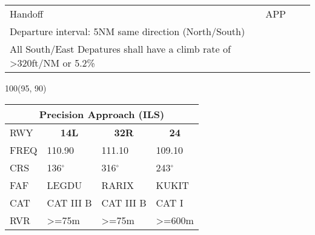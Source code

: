 \documentclass[10pt,landscape,a4paper]{article}
\begin{document}
\begin{textblock}{40}
\begin{table}[]
\begin{tabular}{lccccccc}
\multicolumn{2}{|l}{Handoff} & 
\multicolumn{4}{c}{\textunderscore{}APP} & 
\multicolumn{1}{c|}{} & 
\multicolumn{1}{l}{} \\ \cline{1-7}
\multicolumn{5}{l}{Departure interval: 5NM same direction (North/South)} \\
\multicolumn{5}{l}{All South/East Depatures shall have a climb rate of \textgreater{}320ft/NM or 5.2\%}
\end{tabular}
\end{table}
\end{textblock}



\begin{textblock}{100}(95, 90)
\begin{table}[]
\begin{tabular}{llll}
\multicolumn{4}{c}{\textbf{Precision Approach (ILS)}} \\ \hline
\multicolumn{1}{|l|}{RWY} & \multicolumn{1}{c|}{\textbf{14L}} & \multicolumn{1}{c|}{\textbf{32R}} & \multicolumn{1}{c|}{\textbf{24}} \\ \hline
\multicolumn{1}{|l|}{FREQ} & \multicolumn{1}{l|}{110.90} & \multicolumn{1}{l|}{111.10} & \multicolumn{1}{l|}{109.10} \\
\multicolumn{1}{|l|}{CRS} & \multicolumn{1}{l|}{136$^\circ$} & \multicolumn{1}{l|}{316$^\circ$} & \multicolumn{1}{l|}{243$^\circ$} \\
\multicolumn{1}{|l|}{FAF} & \multicolumn{1}{l|}{LEGDU} & \multicolumn{1}{l|}{RARIX} & \multicolumn{1}{l|}{KUKIT} \\
\multicolumn{1}{|l|}{CAT} & \multicolumn{1}{l|}{CAT III B} & \multicolumn{1}{l|}{CAT III B} & \multicolumn{1}{l|}{CAT I} \\
\multicolumn{1}{|l|}{RVR} & \multicolumn{1}{l|}{\textgreater{}=75m} & \multicolumn{1}{l|}{\textgreater{}=75m} & \multicolumn{1}{l|}{\textgreater{}=600m} \\ \hline
\end{tabular}
\end{table}
\end{textblock}
\end{document}
